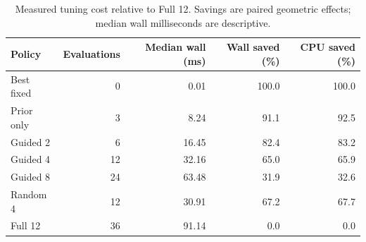 \begin{table}[t]
\centering\small
\caption{Measured tuning cost relative to Full 12. Savings are paired geometric effects; median wall milliseconds are descriptive.}
\label{tab:selection}
\begin{tabular}{lrrrr}
\hline
Policy & Evaluations & Median wall (ms) & Wall saved (\%) & CPU saved (\%)\\
\hline
Best fixed & 0 & 0.01 & 100.0 & 100.0 \\
Prior only & 3 & 8.24 & 91.1 & 92.5 \\
Guided 2 & 6 & 16.45 & 82.4 & 83.2 \\
Guided 4 & 12 & 32.16 & 65.0 & 65.9 \\
Guided 8 & 24 & 63.48 & 31.9 & 32.6 \\
Random 4 & 12 & 30.91 & 67.2 & 67.7 \\
Full 12 & 36 & 91.14 & 0.0 & 0.0 \\
\hline
\end{tabular}
\end{table}
